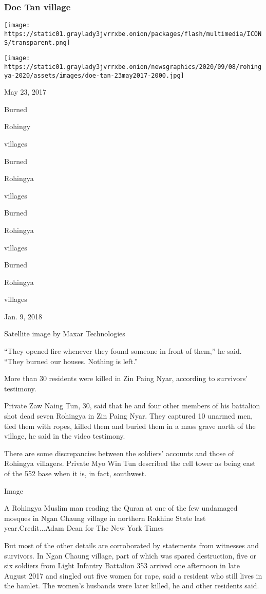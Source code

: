 \hypertarget{doe-tan-village}{%
\subsubsection{Doe Tan village}\label{doe-tan-village}}

\texttt{[image: https://static01.graylady3jvrrxbe.onion/packages/flash/multimedia/ICONS/transparent.png]}

\texttt{[image: https://static01.graylady3jvrrxbe.onion/newsgraphics/2020/09/08/rohingya-2020/assets/images/doe-tan-23may2017-2000.jpg]}

May 23, 2017

Burned

Rohingy

villages

Burned

Rohingya

villages

Burned

Rohingya

villages

Burned

Rohingya

villages

Jan. 9, 2018

Satellite image by Maxar Technologies

``They opened fire whenever they found someone in front of them,'' he
said. ``They burned our houses. Nothing is left.''

More than 30 residents were killed in Zin Paing Nyar, according to
survivors' testimony.

Private Zaw Naing Tun, 30, said that he and four other members of his
battalion shot dead seven Rohingya in Zin Paing Nyar. They captured 10
unarmed men, tied them with ropes, killed them and buried them in a mass
grave north of the village, he said in the video testimony.

There are some discrepancies between the soldiers' accounts and those of
Rohingya villagers. Private Myo Win Tun described the cell tower as
being east of the 552 base when it is, in fact, southwest.

Image

A Rohingya Muslim man reading the Quran at one of the few undamaged
mosques in Ngan Chaung village in northern Rakhine State last
year.Credit...Adam Dean for The New York Times

But most of the other details are corroborated by statements from
witnesses and survivors. In Ngan Chaung village, part of which was
spared destruction, five or six soldiers from Light Infantry Battalion
353 arrived one afternoon in late August 2017 and singled out five women
for rape, said a resident who still lives in the hamlet. The women's
husbands were later killed, he and other residents said.


